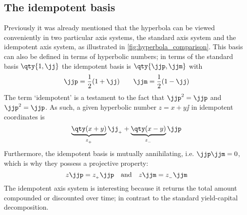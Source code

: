\subsection{The idempotent basis}
Previously it was already mentioned that the hyperbola can be viewed conveniently in two particular axis systems, the standard axis system and the idempotent axis system, as illustrated in \cref{fig:hyperbola_comparison}. This basis can also be defined in terms of hyperbolic numbers; in terms of the standard basis \(\qty{1, \jj}\) the idempotent basis is \(\qty{\jjp, \jjm}\) with 
\[
     \jjp = \frac{1}{2}(1 + \jj) \qquad \jjm = \frac{1}{2}(1 - \jj)
\]
The term `idempotent' is a testament to the fact that \(\jjp^2 = \jjp\) and \(\jjp^2 = \jjp\). As such, a given hyperbolic number \(z = x + y\jj\) in idempotent coordinates is 
\[
     \underbrace{\qty(x + y)}_{z_{_+}}\jj_{_+} + \underbrace{\qty(x - y)}_{z_{_-}}\jjp
\]
Furthermore, the idempotent basis is mutually annihilating, i.e. \(\jjp \jjm = 0\), which is why they possess a projective property: \cite{Sobczyk1995}
\[
     z\jjp = z_{_+}\jjp\quad\text{and}\quad z\jjm = z_{_-}\jjm
\]
The idempotent axis system is interesting because it returns the total amount compounded or discounted over time; in contrast to the standard yield-capital decomposition.
